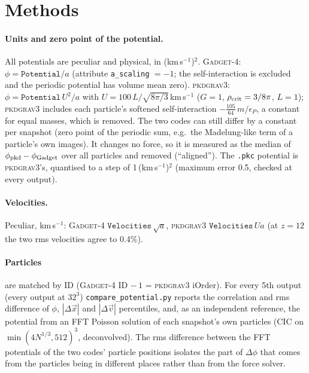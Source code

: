 \documentclass[11pt,a4paper]{article}
\newcommand{\pkd}{\textsc{pkdgrav3}}
\newcommand{\gad}{\textsc{Gadget-4}}
\newcommand{\fp}[1]{\nolinkurl{#1}}
\newcommand{\kms}{(km\,s$^{-1}$)$^2$}
\begin{document}
\section{Methods}
\label{sec:methods}

\paragraph{Units and zero point of the potential.} All potentials are peculiar and physical, in \kms.
\gad{}: $\phi = \texttt{Potential}/a$ (attribute \texttt{a\_scaling} $=-1$; the self-interaction is excluded and the
periodic potential has volume mean zero). \pkd{}: $\phi = \texttt{Potential}\,U^2/a$ with
$U = 100\,L/\sqrt{8\pi/3}$\,km\,s$^{-1}$ ($G = 1$, $\rho_{\rm crit} = 3/8\pi$, $L = 1$); \pkd{} includes each
particle's softened self-interaction $-\tfrac{105}{64}\,m/\epsilon_P$, a constant for equal masses, which is
removed. The two codes can still differ by a constant per snapshot (zero point of the periodic sum, e.g.\ the
Madelung-like term of a particle's own images). It changes no force, so it is measured as the median of
$\phi_{\rm pkd} - \phi_{\rm Gadget}$ over all particles and removed (``aligned''). The \texttt{.pkc} potential is
\pkd{}'s, quantised to a step of 1\,\kms{} (maximum error 0.5, checked at every output).

\paragraph{Velocities.} Peculiar, km\,s$^{-1}$: \gad{} $\texttt{Velocities}\,\sqrt{a}$, \pkd{} $\texttt{Velocities}\,U a$
(at $z=12$ the two rms velocities agree to 0.4\%).

\paragraph{Particles} are matched by ID (\gad{} ID $-\,1$ = \pkd{} iOrder). For every 5th output (every output at
$32^3$) \fp{compare_potential.py} reports the correlation and rms difference of $\phi$, $|\Delta\vec x|$ and
$|\Delta \vec v|$ percentiles, and, as an independent reference, the potential from an FFT Poisson solution of
each snapshot's own particles (CIC on $\min(4N^{1/3}, 512)^3$, deconvolved). The rms difference
between the FFT potentials of the two codes' particle positions isolates the part of $\Delta\phi$ that comes from
the particles being in different places rather than from the force solver.
\end{document}
